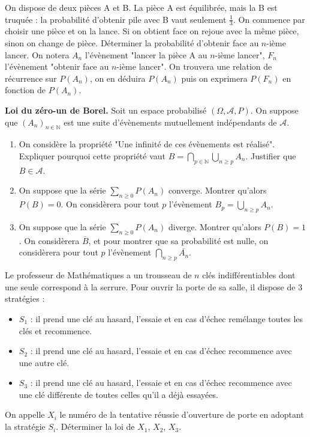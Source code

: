 \begin{exercice}
On dispose de deux pièces A et B. La pièce A est équilibrée, mais la B est truquée : la probabilité d'obtenir pile avec B vaut seulement $\frac{1}{3}$. On commence par choisir une pièce et on la lance. Si on obtient face on rejoue avec la même pièce, sinon on change de pièce.
Déterminer la probabilité d'obtenir face au $n$-ième lancer.
On notera $A_{n}$ l'évènement "lancer la pièce A au $n$-ième lancer", $F_{n}$ l'évènement "obtenir face au $n$-ième lancer". On trouvera une relation de récurrence sur $P(A_{n})$, on en déduira $P(A_{n})$ puis on exprimera $P(F_{n})$ en fonction de $P(A_{n})$.
\end{exercice}

\begin{exercice}
\textbf{Loi du zéro-un de Borel.}
Soit un espace probabilisé $(\Omega, \mathcal{A}, P)$. On suppose que $(A_{n})_{n\in\mathbb{N}}$ est une suite d'évènements mutuellement indépendants de $\mathcal{A}$.
\begin{enumerate}
    \item On considère la propriété "Une infinité de ces évènements est réalisé". Expliquer pourquoi cette propriété vaut $B=\bigcap_{p\in\mathbb{N}}\bigcup_{n\ge p}A_{n}$. Justifier que $B\in\mathcal{A}$.
    \item On suppose que la série $\sum_{n\ge0}P(A_{n})$ converge. Montrer qu'alors $P(B)=0$. On considèrera pour tout $p$ l'évènement $B_{p}=\bigcup_{n\ge p}A_{n}$.
    \item On suppose que la série $\sum_{n\ge0}P(A_{n})$ diverge. Montrer qu'alors $P(B)=1$. On considèrera $\overline{B}$, et pour montrer que sa probabilité est nulle, on considèrera pour tout $p$ l'évènement $\bigcap_{n\ge p}\overline{A_{n}}$.
\end{enumerate}
\end{exercice}

\begin{exercice}
Le professeur de Mathématiques a un trousseau de $n$ clés indifférentiables dont une seule correspond à la serrure. Pour ouvrir la porte de sa salle, il dispose de 3 stratégies :
\begin{itemize}
    \item $S_{1}$ : il prend une clé au hasard, l'essaie et en cas d'échec remélange toutes les clés et recommence.
    \item $S_{2}$ : il prend une clé au hasard, l'essaie et en cas d'échec recommence avec une autre clé.
    \item $S_{3}$ : il prend une clé au hasard, l'essaie et en cas d'échec recommence avec une clé différente de toutes celles qu'il a déjà essayées.
\end{itemize}
On appelle $X_{i}$ le numéro de la tentative réussie d'ouverture de porte en adoptant la stratégie $S_{i}$. Déterminer la loi de $X_{1}$, $X_{2}$, $X_{3}$.
\end{exercice}

